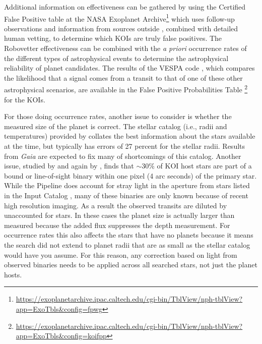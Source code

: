 Additional information on effectiveness can be gathered by using the Certified False Positive table at the NASA Exoplanet Archive\footnote{\url{https://exoplanetarchive.ipac.caltech.edu/cgi-bin/TblView/nph-tblView?app=ExoTbls\&config=fpwg}} which uses follow-up observations and information from sources outside \kepler{}, combined with detailed human vetting, to determine which KOIs are truly false positives. The Robovetter effectiveness can be combined with the \emph{a priori} occurrence rates of the different types of astrophysical events to determine the astrophysical reliability of planet candidates. The results of the VESPA code \citep[][]{Morton2016}, which compares the likelihood that a signal comes from a transit to that of one of these other astrophysical scenarios, are available in the False Positive Probabilities Table \footnote{\url{https://exoplanetarchive.ipac.caltech.edu/cgi-bin/TblView/nph-tblView?app=ExoTbls\&config=koifpp}} for the KOIs.

For those doing occurrence rates, another issue to consider is whether the measured size of the planet is correct. The stellar catalog (i.e., radii and temperatures) provided by \citet{Mathur2017ApJS} collates the best information about the \Kepler{} stars available at the time, but typically has errors of 27 percent for the stellar radii. Results from \textit{Gaia} \citep{gaia1,gaia2} are expected to fix many of shortcomings of this catalog. Another issue, studied by \citet{Ciardi2015} and again by \citet{Furlan2017}, finds that $\sim$30\% of KOI host stars are part of a bound or line-of-sight binary within one \Kepler{} pixel (4 arc seconds) of the primary star. While the \Kepler{} Pipeline does account for stray light in the aperture from stars listed in the \Kepler{} Input Catalog \citep{Brown2011}, many of these binaries are only known because of recent high resolution imaging. As a result the observed transits are diluted by unaccounted for stars. In these cases the planet size is actually larger than measured because the added flux suppresses the depth measurement. For occurrence rates this also affects the stars that have no planets because it means the search did not extend to planet radii that are as small as the stellar catalog would have you assume.  For this reason, any correction based on light from observed binaries needs to be applied across all searched stars, not just the planet hosts.



